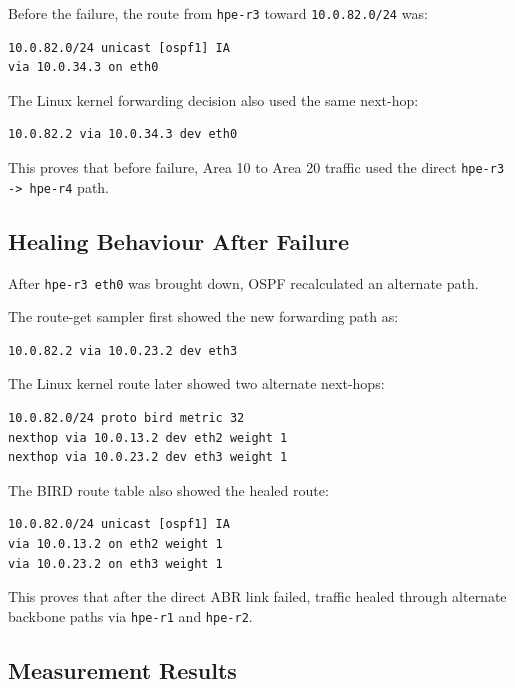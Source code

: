 Before the failure, the route from \texttt{hpe-r3} toward \texttt{10.0.82.0/24} was:

\begin{verbatim}
10.0.82.0/24 unicast [ospf1] IA
via 10.0.34.3 on eth0
\end{verbatim}

The Linux kernel forwarding decision also used the same next-hop:

\begin{verbatim}
10.0.82.2 via 10.0.34.3 dev eth0
\end{verbatim}

This proves that before failure, Area 10 to Area 20 traffic used the direct \texttt{hpe-r3 -> hpe-r4} path.

\subsection{Healing Behaviour After Failure}

After \texttt{hpe-r3 eth0} was brought down, OSPF recalculated an alternate path.

The route-get sampler first showed the new forwarding path as:

\begin{verbatim}
10.0.82.2 via 10.0.23.2 dev eth3
\end{verbatim}

The Linux kernel route later showed two alternate next-hops:

\begin{verbatim}
10.0.82.0/24 proto bird metric 32
nexthop via 10.0.13.2 dev eth2 weight 1
nexthop via 10.0.23.2 dev eth3 weight 1
\end{verbatim}

The BIRD route table also showed the healed route:

\begin{verbatim}
10.0.82.0/24 unicast [ospf1] IA
via 10.0.13.2 on eth2 weight 1
via 10.0.23.2 on eth3 weight 1
\end{verbatim}

This proves that after the direct ABR link failed, traffic healed through alternate backbone paths via \texttt{hpe-r1} and \texttt{hpe-r2}.

\subsection{Measurement Results}

